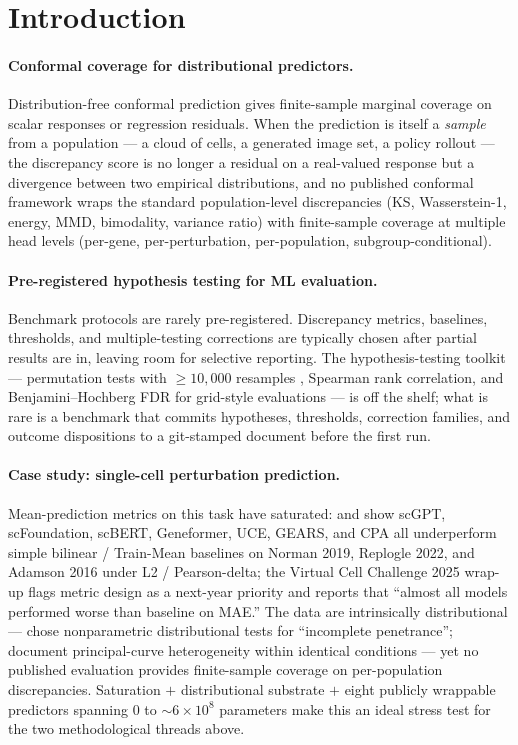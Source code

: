 \documentclass{article}
\begin{document}
\section{Introduction}

\paragraph{Conformal coverage for distributional predictors.}
Distribution-free conformal prediction \citep{vovk2012, romano2019, izbicki2022, tibshirani2019, cauchois2021, bates2021, otcp2025} gives finite-sample marginal coverage on scalar responses or regression residuals. When the prediction is itself a \emph{sample} from a population --- a cloud of cells, a generated image set, a policy rollout --- the discrepancy score is no longer a residual on a real-valued response but a divergence between two empirical distributions, and no published conformal framework wraps the standard population-level discrepancies (KS, Wasserstein-1, energy, MMD, bimodality, variance ratio) with finite-sample coverage at multiple head levels (per-gene, per-perturbation, per-population, subgroup-conditional).

\paragraph{Pre-registered hypothesis testing for ML evaluation.}
Benchmark protocols are rarely pre-registered. Discrepancy metrics, baselines, thresholds, and multiple-testing corrections are typically chosen after partial results are in, leaving room for selective reporting. The hypothesis-testing toolkit --- permutation tests with $\geq 10{,}000$ resamples \citep{szekely2013}, Spearman rank correlation, and Benjamini--Hochberg FDR for grid-style evaluations --- is off the shelf; what is rare is a benchmark that commits hypotheses, thresholds, correction families, and outcome dispositions to a git-stamped document before the first run.

\paragraph{Case study: single-cell perturbation prediction.}
Mean-prediction metrics on this task have saturated: \citet{ahlmann2025} and \citet{csendes2025} show scGPT, scFoundation, scBERT, Geneformer, UCE, GEARS, and CPA all underperform simple bilinear / Train-Mean baselines on Norman 2019, Replogle 2022, and Adamson 2016 under L2 / Pearson-delta; the Virtual Cell Challenge 2025 wrap-up flags metric design as a next-year priority and reports that ``almost all models performed worse than baseline on MAE.'' The data are intrinsically distributional --- \citet{replogle2022} chose nonparametric distributional tests for ``incomplete penetrance''; \citet{norman2019} document principal-curve heterogeneity within identical conditions --- yet no published evaluation provides finite-sample coverage on per-population discrepancies. Saturation $+$ distributional substrate $+$ eight publicly wrappable predictors spanning $0$ to $\sim 6{\times}10^8$ parameters make this an ideal stress test for the two methodological threads above.
\end{document}
